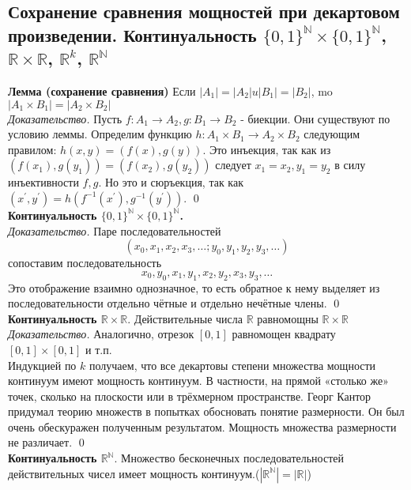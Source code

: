 \documentclass[a4paper]{article}
\begin{document}
\subsection{Сохранение сравнения мощностей при декартовом произведении. Континуальность $\{0,1\}^{\mathbb{N}}\times\{0,1\}^{\mathbb{N}}$, $\mathbb{R}\times\mathbb{R}$, $\mathbb{R}^k$, $\mathbb{R}^{\mathbb{N}}$}
\textbf{Лемма (сохранение сравнения)} Если $\left|A_{1}\right|=\left|A_{2}\right| u\left|B_{1}\right|=\left|B_{2}\right|$, mo $\left|A_{1} \times B_{1}\right|=\left|A_{2} \times B_{2}\right|$\\[2mm]
\textit{Доказательство.} Пусть $f: A_{1} \rightarrow A_{2}, g: B_{1} \rightarrow B_{2}$ - биекции. Они существуют по условию леммы. Определим функцию $h: A_{1} \times B_{1} \rightarrow A_{2} \times B_{2}$ следующим правилом: $h(x, y)=(f(x), g(y))$. Это инъекция, так как из $\left(f\left(x_{1}\right), g\left(y_{1}\right)\right)=\left(f\left(x_{2}\right), g\left(y_{2}\right)\right)$ следует $x_{1}=x_{2}, y_{1}=y_{2}$ в силу инъективности $f, g$. Но это и сюръекция, так как $\left(x^{\prime}, y^{\prime}\right)=h\left(f^{-1}\left(x^{\prime}\right), g^{-1}\left(y^{\prime}\right)\right)$. \qed\\[2mm]
\textbf{Континуальность $\{0,1\}^{\mathbb{N}}\times\{0,1\}^{\mathbb{N}}$.}\\[2mm]
\textit{Доказательство.} Паре последовательностей
$$\left(x_{0}, x_{1}, x_{2}, x_{3}, \ldots ; y_{0}, y_{1}, y_{2}, y_{3}, \ldots\right)$$
сопоставим последовательность
$$
x_{0}, y_{0}, x_{1}, y_{1}, x_{2}, y_{2}, x_{3}, y_{3}, \ldots
$$
 Это отображение взаимно однозначное, то есть обратное к нему выделяет из последовательности отдельно чётные и отдельно нечётные члены. \qed\\[2mm]
\label{sec:2.36}\textbf{Континуальность $\mathbb{R}\times\mathbb{R}$}. Действительные числа $\mathbb{R}$ равномощны $\mathbb{R} \times \mathbb{R}$\\[2mm]
\textit{Доказательство.} Аналогично, отрезок $[0,1]$ равномощен квадрату $[0,1] \times[0,1]$ и т.п.\\[2mm]
 Индукцией по $k$ получаем, что все декартовы степени множества мощности континуум имеют мощность континуум. В частности, на прямой «столько же» точек, сколько на плоскости или в трёхмерном пространстве. Георг Кантор придумал теорию множеств в попытках обосновать понятие размерности. Он был очень обескуражен полученным результатом. Мощность множества размерности не различает. \qed\\[2mm]
\textbf{Континуальность $\mathbb{R}^{\mathbb{N}}$}. Множество бесконечных последовательностей действительных чисел имеет мощность континуум.($\left|\mathbb{R}^{\mathbb{N}}\right|=|\mathbb{R}|$)\\[2mm]
\end{document}
